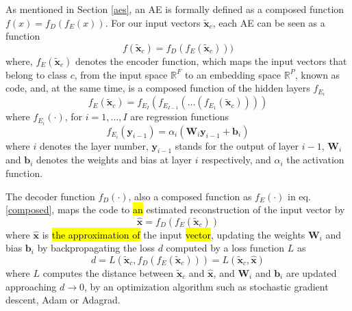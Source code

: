 \documentclass[journal,article,submit,pdftex,moreauthors]{Definitions/mdpi}
\begin{document}
As mentioned in Section \ref{aes}, an AE is formally defined as a composed function $f(x) = f_D(f_E(x))$. For our input vectors $\mathbf{\tilde{x}}_c$, each AE can be seen as a function
\begin{equation}
	f(\mathbf{\tilde{x}}_c) = f_D(f_E(\mathbf{\tilde{x}}_c)))
\end{equation}
where, $f_E(\mathbf{\tilde{x}}_c)$ denotes the encoder function, which maps the input vectors that belong to class $c$, from the input space $\mathbb{R}^F$ to an embedding space $\mathbb{R}^P$, known as code,
and, at the same time, is a composed function of the hidden layers $f_{E_i}$
\begin{equation}
	f_E(\mathbf{\tilde{x}}_c) = f_{E_{I}}(f_{E_{I-1}}(\dots (f_{E_{1}}(\mathbf{\tilde{x}}_c))))
	\label{composed}
\end{equation}
where $f_{E_{i}}(\cdot)$, for $i = 1, \dots, I$ are regression functions
\begin{equation}
	f_{E_{i}}(\mathbf{y}_{i-1}) = \alpha_i(\mathbf{W}_{i}\mathbf{y}_{i-1} + \mathbf{b}_{i})
\end{equation}
where $i$ denotes the layer number, $\mathbf{y}_{i-1}$ stands for the output of layer $i-1$, $\mathbf{W}_{i}$ and $\mathbf{b}_{i}$ denotes the weights and bias at layer $i$ respectively, and $\alpha_i$ the activation function.

The decoder function $f_D(\cdot)$, also a composed function as $f_E(\cdot)$ in eq. \ref{composed}, maps the code to \hl{an} estimated reconstruction of the input vector by
\begin{equation}
	\mathbf{\hat{x}} = f_{D}(f_E(\mathbf{\mathbf{\tilde{x}}}_c))
\end{equation}
where $\mathbf{\hat{x}}$ is \hl{the approximation of} the input \hl{vector}, updating the weights $\mathbf{W}_i$ and bias $\mathbf{b}_i$ by backpropagating the loss $d$ computed by a loss function $L$ as
\begin{equation}
	d = L(\mathbf{\tilde{x}}_c, f_D(f_E(\mathbf{\tilde{x}}_c))) = L(\mathbf{\tilde{x}}_c, \mathbf{\hat{x}})
	\label{loss}
\end{equation}
where $L$ computes the distance between $\mathbf{\tilde{x}}_c$ and $\mathbf{\hat{x}}$, and $\mathbf{W}_i$ and $\mathbf{b}_i$ are updated approaching $d \to 0$, by an optimization algorithm such as stochastic gradient descent, Adam or Adagrad.
\end{document}
